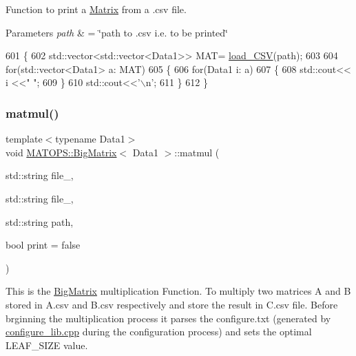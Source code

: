 Function to print a \hyperlink{classMATOPS_1_1Matrix}{Matrix} from a .csv file. 


\begin{DoxyParams}{Parameters}
{\em path} & = \char`\"{}path to .\+csv i.\+e. to be printed\char`\"{} \\
\hline
\end{DoxyParams}

\begin{DoxyCode}
601                 \{
602                         std::vector<std::vector<Data1>> MAT= \hyperlink{classMATOPS_1_1BigMatrix_a43e1704cb38eb6d0121be5b71014eb8e}{load\_CSV}(path);
603 
604                         \textcolor{keywordflow}{for}(std::vector<Data1> a: MAT)
605                         \{
606                                 \textcolor{keywordflow}{for}(Data1 i: a)
607                                 \{
608                                         std::cout<< i <<\textcolor{stringliteral}{" "};
609                                 \}
610                                 std::cout<<\textcolor{charliteral}{'\(\backslash\)n'};
611                         \}
612                 \}
\end{DoxyCode}
\mbox{\label{classMATOPS_1_1BigMatrix_ac793236874a8ccfd66e21006011b9cff}} 
\subsubsection{\texorpdfstring{matmul()}{matmul()}}
{\footnotesize\ttfamily template$<$typename Data1$>$ \\
void \hyperlink{classMATOPS_1_1BigMatrix}{M\+A\+T\+O\+P\+S\+::\+Big\+Matrix}$<$ Data1 $>$\+::matmul (\begin{DoxyParamCaption}\item[{std\+::string}]{file\+\_,  }\item[{std\+::string}]{file\+\_,  }\item[{std\+::string}]{path,  }\item[{bool}]{print = {\ttfamily false} }\end{DoxyParamCaption})\hspace{0.3cm}{\ttfamily [inline]}}



This is the \hyperlink{classMATOPS_1_1BigMatrix}{Big\+Matrix} multiplication Function. To multiply two matrices A and B stored in A.\+csv and B.\+csv respectively and store the result in C.\+csv file. Before brginning the multiplication process it parses the configure.\+txt (generated by \hyperlink{configure__lib_8cpp}{configure\+\_\+lib.\+cpp} during the configuration process) and sets the optimal L\+E\+A\+F\+\_\+\+S\+I\+ZE value. 


